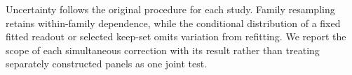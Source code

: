 Uncertainty follows the original procedure for each study.
%
Family resampling retains within-family dependence, while the conditional distribution of a fixed fitted readout or selected keep-set omits variation from refitting.
%
We report the scope of each simultaneous correction with its result rather than treating separately constructed panels as one joint test.
%
